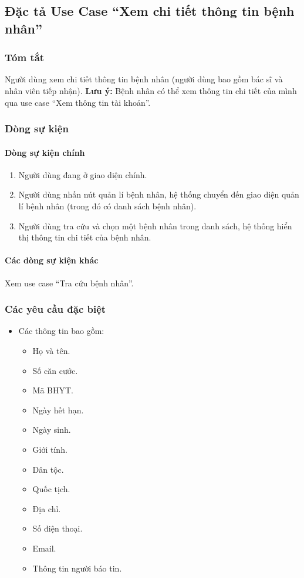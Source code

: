 \subsection{Đặc tả Use Case ``Xem chi tiết thông tin bệnh nhân''}

\subsubsection{Tóm tắt}
Người dùng xem chi tiết thông tin bệnh nhân (người dùng bao gồm bác sĩ và nhân viên tiếp nhận).
\textbf{Lưu ý:} Bệnh nhân có thể xem thông tin chi tiết của mình qua use case ``Xem thông tin tài khoản''.

\subsubsection{Dòng sự kiện}
\paragraph{\textbf{Dòng sự kiện chính}}
\begin{enumerate}
  \item Người dùng đang ở giao diện chính.
  \item Người dùng nhấn nút quản lí bệnh nhân, hệ thống chuyển đến giao diện quản lí bệnh nhân (trong đó có danh sách bệnh nhân).
  \item Người dùng tra cứu và chọn một bệnh nhân trong danh sách, hệ thống hiển thị thông tin chi tiết của bệnh nhân.
\end{enumerate}

\paragraph{\textbf{Các dòng sự kiện khác}}
Xem use case ``Tra cứu bệnh nhân''.

\subsubsection{Các yêu cầu đặc biệt}
\begin{itemize}
  \item Các thông tin bao gồm:
    \begin{itemize}
      \item Họ và tên.
      \item Số căn cước.
      \item Mã BHYT.
      \item Ngày hết hạn.
      \item Ngày sinh.
      \item Giới tính.
      \item Dân tộc.
      \item Quốc tịch.
      \item Địa chỉ.
      \item Số điện thoại.
      \item Email.
      \item Thông tin người báo tin.
    \end{itemize}
\end{itemize}

